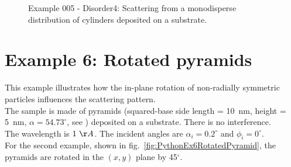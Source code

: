 \begin{figure}[H]
\hfill
{}
\hfill
{}
\hfill
\caption{Example 005 - Disorder4: Scattering from a monodisperse distribution of cylinders deposited on a substrate.}
\label{fig:PythonEx5Dis4}
\end{figure}

\newpage
\section{Example 6: Rotated pyramids}
This example illustrates how the in-plane rotation of non-radially symmetric particles influences the scattering pattern. \\
The sample is made of pyramids (squared-base side length = 10~nm, height = 5~nm, $\alpha=54.73^{\circ}$, see ) deposited on a substrate. There is no interference.\\
The wavelength is $1~\AA$. The incident angles are $\alpha_i=0.2^{\circ}$ and $\phi_i=0^{\circ}$.\\
For the second example, shown in fig.~\ref{fig:PythonEx6RotatedPyramid}, the pyramids are rotated in the $(x,y)$ plane by 45$^{\circ}$.

